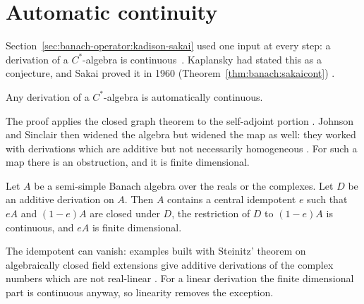 \section{Automatic continuity}\label{sec:banach-operator:automatic-continuity}

Section~\ref{sec:banach-operator:kadison-sakai} used one input at every
step: a derivation of a $C^*$-algebra is continuous~\cite[p.~31]{Sakai1960Kaplansky}. Kaplansky had
stated this as a conjecture, and Sakai proved it in 1960 (Theorem~\ref{thm:banach:sakaicont})
\cite[p.~31]{Sakai1960Kaplansky}.\begin{theorem}\label{thm:banach:sakaicont}
Any derivation of a $C^*$-algebra is automatically continuous.
\end{theorem}

The proof applies the closed graph theorem to the self-adjoint portion
\cite[p.~31]{Sakai1960Kaplansky}. Johnson and Sinclair then widened the
algebra but widened the map as well: they worked with derivations which
are additive but not necessarily homogeneous
\cite[p.~1067]{JohnsonSinclair1968}. For such a map there is an
obstruction, and it is finite dimensional.

\begin{theorem}\label{thm:banach:js}
Let $A$ be a semi-simple Banach algebra over the reals or the complexes.
Let $D$ be an additive derivation on $A$. Then $A$ contains a central
idempotent $e$ such that $eA$ and $(1-e)A$ are closed under $D$, the
restriction of $D$ to $(1-e)A$ is continuous, and $eA$ is finite
dimensional.
\end{theorem}

The idempotent can vanish: examples built with Steinitz' theorem on
algebraically closed field extensions give additive derivations of the
complex numbers which are not real-linear
\cite[p.~1072]{JohnsonSinclair1968}. For a linear derivation the finite
dimensional part is continuous anyway, so linearity removes the exception.

